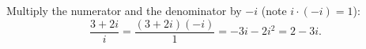 Multiply the numerator and the denominator by $-i$ (note $i\cdot(-i)=1$):
\[\dfrac{3+2i}{i}=\dfrac{(3+2i)(-i)}{1}=-3i-2i^2=\boxed{2-3i}.\]
